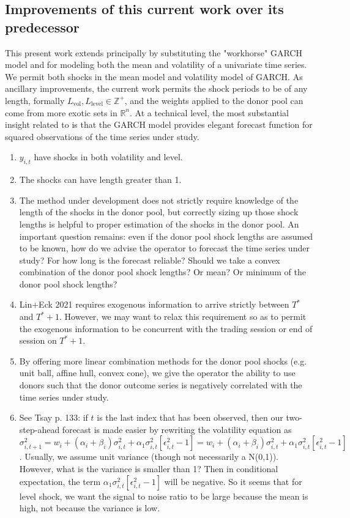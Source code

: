 \documentclass[11pt]{article}
\theoremstyle{definition}
\begin{document}
\subsection{Improvements of this current work over its predecessor}
This present work extends \citet{lin2021minimizing} principally by substituting the "workhorse" GARCH model and for modeling both the mean and volatility of a univariate time series.  We permit both shocks in the mean model and volatility model of GARCH.  As ancillary improvements, the current work permits the shock periods to be of any length, formally $L_{\text{vol}}, L_{\text{level}} \in \mathbb{Z}^{+}$, and the weights applied to the donor pool can come from more exotic sets in $\mathbb{R}^{n}$.  At a technical level, the most substantial insight related to \citet{lin2021minimizing} is that the GARCH model provides elegant forecast function for squared observations of the time series under study. 

\begin{enumerate}
\item $y_{i,t}$ have shocks in both volatility and level.
\item The shocks can have length greater than 1.
\item The method under development does not strictly require knowledge of the length of the shocks in the donor pool, but correctly sizing up those shock lengths is helpful to proper estimation of the shocks in the donor pool.  An important question remains: even if the donor pool shock lengths are assumed to be known, how do we advise the operator to forecast the time series under study?  For how long is the forecast reliable?  Should we take a convex combination of the donor pool shock lengths?  Or mean? Or minimum of the donor pool shock lengths?
\item Lin+Eck 2021 requires exogenous information to arrive strictly between $T^{*}$ and $T^{*}+1$.  However, we may want to relax this requirement so as to permit the exogenous information to be concurrent with the trading session or end of session on $T^{*}+1$.
\item By offering more linear combination methods for the donor pool shocks (e.g. unit ball, affine hull, convex cone), we give the operator the ability to use donors such that the donor outcome series is negatively correlated with the time series under study.
\item See Tsay p. 133: if $t$ is the last index that has been observed, then our two-step-ahead forecast is made easier by rewriting the volatility equation as $\sigma^{2}_{i,t+1} = w_{i} + (\alpha_{i} + \beta_{i})\sigma^{2}_{i,t} + \alpha_{1}\sigma^{2}_{i,t}[\epsilon^{2}_{i,t} - 1]= w_{i} + (\alpha_{i} + \beta_{i})\sigma^{2}_{i,t} + \alpha_{1}\sigma^{2}_{i,t}[\epsilon^{2}_{i,t} - 1] $.  Usually, we assume unit variance (though not necessarily a N(0,1)).  However, what is the variance is smaller than 1?  Then in conditional expectation, the term $\alpha_{1}\sigma^{2}_{i,t}[\epsilon^{2}_{i,t} - 1]$ will be negative.  So it seems that for level shock, we want the signal to noise ratio to be large because the mean is high, not because the variance is low.
\end{enumerate}
\end{document}
